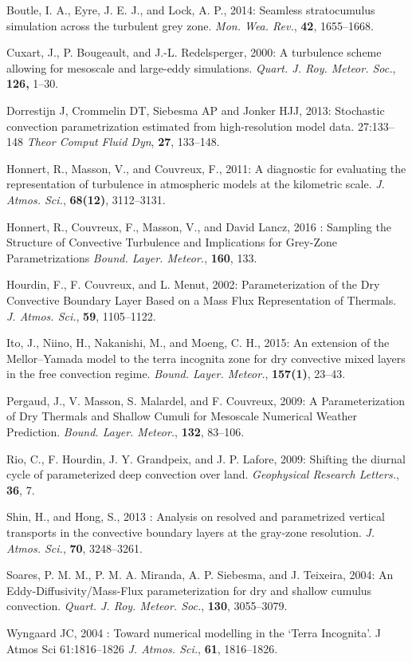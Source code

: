 \noindent \por
Boutle, I. A., Eyre, J. E. J., and Lock, A. P., 2014:
Seamless stratocumulus simulation across the turbulent grey zone. 
{\it Mon. Wea. Rev.}, {\bf 42}, 1655--1668. 

\noindent \por
Cuxart, J., P. Bougeault, and J.-L. Redelsperger, 2000:
A turbulence scheme allowing for mesoscale and large-eddy simulations.
{\it Quart. J. Roy. Meteor. Soc.}, {\bf 126,} 1--30.

\noindent \por
Dorrestijn J, Crommelin DT, Siebesma AP and Jonker HJJ, 2013:
Stochastic convection parametrization estimated from high-resolution model data.  27:133--148
{\it Theor Comput Fluid Dyn}, {\bf 27}, 133--148.

\noindent \por
Honnert, R., Masson, V., and Couvreux, F., 2011:
A diagnostic for evaluating the representation of turbulence in atmospheric models at the kilometric scale.  
{\it J. Atmos. Sci.}, {\bf 68(12)}, 3112--3131.

\noindent \por
Honnert, R., Couvreux, F., Masson, V., and David Lancz, 2016 :
Sampling the Structure of Convective Turbulence and Implications for Grey-Zone Parametrizations
{\it Bound. Layer. Meteor.}, {\bf 160}, 133.

\noindent \por
Hourdin, F., F. Couvreux, and L. Menut, 2002:
Parameterization of the Dry Convective Boundary Layer Based on a Mass Flux Representation of Thermals.
{\it J. Atmos. Sci.}, {\bf 59}, 1105--1122.

\noindent \por
Ito, J., Niino, H., Nakanishi, M., and Moeng, C. H., 2015:
An extension of the Mellor–Yamada model to the terra incognita zone for dry convective mixed layers in the free convection regime.
{\it Bound. Layer. Meteor.}, {\bf 157(1)}, 23--43.

\noindent \por
Pergaud, J., V. Masson, S. Malardel, and F. Couvreux, 2009:
A Parameterization of Dry
  Thermals and Shallow Cumuli for Mesoscale Numerical Weather Prediction.
{\it Bound. Layer. Meteor.}, {\bf 132}, 83--106.

\noindent \por
Rio, C., F. Hourdin, J. Y. Grandpeix, and J. P. Lafore, 2009:
Shifting the diurnal cycle of parameterized deep convection over land.
{\it Geophysical Research Letters.}, {\bf 36}, 7.

\noindent \por
Shin, H., and Hong, S., 2013 : 
Analysis on resolved and parametrized vertical transports in the convective boundary layers at the gray-zone resolution. 
{\it J. Atmos. Sci.}, {\bf 70}, 3248--3261.

\noindent \por
Soares, P. M. M., P. M. A. Miranda, A. P. Siebesma, and J. Teixeira, 2004:
An Eddy-Diffusivity/Mass-Flux parameterization for dry and shallow cumulus
  convection.
{\it Quart. J. Roy. Meteor. Soc.}, {\bf 130}, 3055--3079.

\noindent \por
Wyngaard JC, 2004 : 
Toward numerical modelling in the ‘Terra Incognita’. J Atmos Sci 61:1816–1826
{\it J. Atmos. Sci.}, {\bf 61}, 1816--1826.
